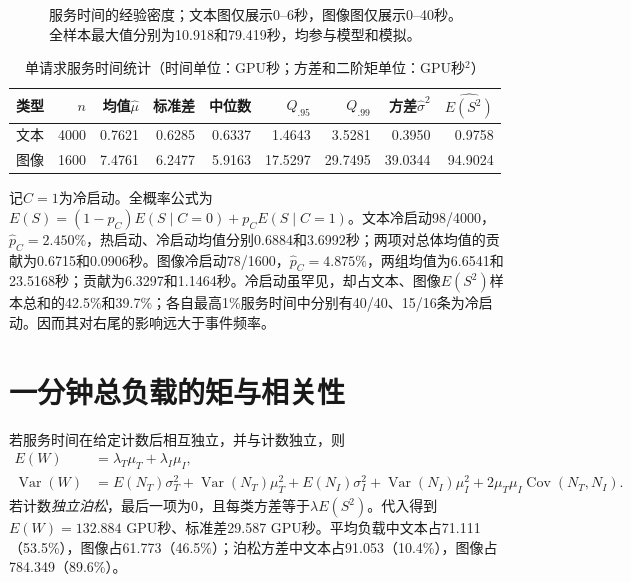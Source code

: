 \documentclass[UTF8,a4paper,11pt,fontset=fandol]{ctexart}
\numberwithin{equation}{section}
\begin{document}
\begin{figure}[htbp]\centering
{}
\caption{服务时间的经验密度；文本图仅展示0--6秒，图像图仅展示0--40秒。全样本最大值分别为10.918和79.419秒，均参与模型和模拟。}
\label{fig:service}
\end{figure}

\begin{table}[htbp]\centering
\caption{单请求服务时间统计（时间单位：GPU秒；方差和二阶矩单位：GPU秒$^2$）}
\begin{tabular}{lrrrrrrrr}\toprule
类型&$n$&均值$\hat\mu$&标准差&中位数&$Q_{.95}$&$Q_{.99}$&方差$\hat\sigma^2$&$\widehat{E(S^2)}$\\\midrule
文本&4000&0.7621&0.6285&0.6337&1.4643&3.5281&0.3950&0.9758\\
图像&1600&7.4761&6.2477&5.9163&17.5297&29.7495&39.0344&94.9024\\\bottomrule
\end{tabular}
\label{tab:service}
\end{table}

记$C=1$为冷启动。全概率公式为$E(S)=(1-p_C)E(S\mid C=0)+p_CE(S\mid C=1)$。文本冷启动98/4000，$\hat p_C=2.450\%$，热启动、冷启动均值分别0.6884和3.6992秒；两项对总体均值的贡献为0.6715和0.0906秒。图像冷启动78/1600，$\hat p_C=4.875\%$，两组均值为6.6541和23.5168秒；贡献为6.3297和1.1464秒。冷启动虽罕见，却占文本、图像$E(S^2)$样本总和的42.5\%和39.7\%；各自最高1\%服务时间中分别有40/40、15/16条为冷启动。因而其对右尾的影响远大于事件频率。

\section{一分钟总负载的矩与相关性}
若服务时间在给定计数后相互独立，并与计数独立，则
\begin{align}
E(W)&=\lambda_T\mu_T+\lambda_I\mu_I,\label{eq:mean}\\
\operatorname{Var}(W)&=E(N_T)\sigma_T^2+\operatorname{Var}(N_T)\mu_T^2
 +E(N_I)\sigma_I^2+\operatorname{Var}(N_I)\mu_I^2
 +2\mu_T\mu_I\operatorname{Cov}(N_T,N_I).\label{eq:var}
\end{align}
若计数\emph{独立泊松}，最后一项为0，且每类方差等于$\lambda E(S^2)$。代入得到$E(W)=132.884$ GPU秒、标准差29.587 GPU秒。平均负载中文本占71.111（53.5\%），图像占61.773（46.5\%）；泊松方差中文本占91.053（10.4\%），图像占784.349（89.6\%）。
\end{document}

